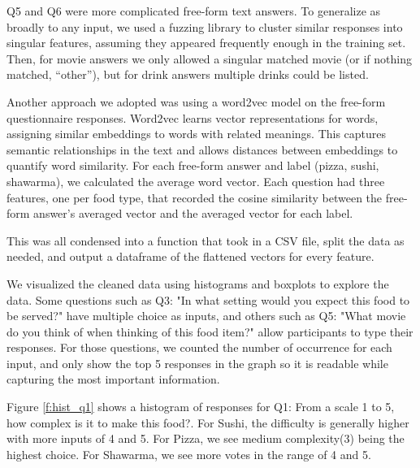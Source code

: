 Q5 and Q6 were more complicated free-form text answers. To generalize as broadly to any input, we used a fuzzing library to cluster similar responses into singular features, assuming they appeared frequently enough in the training set. Then, for movie answers we only allowed a singular matched movie (or if nothing matched, “other”), but for drink answers multiple drinks could be listed.

Another approach we adopted was using a word2vec model on the free-form questionnaire responses. Word2vec learns vector representations for words, assigning similar embeddings to words with related meanings. This captures semantic relationships in the text and allows distances between embeddings to quantify word similarity. For each free-form answer and label (pizza, sushi, shawarma), we calculated the average word vector. Each question had three features, one per food type, that recorded the cosine similarity between the free-form answer's averaged vector and the averaged vector for each label.

This was all condensed into a function that took in a CSV file, split the data as needed, and output a dataframe of the flattened vectors for every feature.

We visualized the cleaned data using histograms and boxplots to explore the data. Some questions such as Q3: "In what setting 
would you expect this food to be served?" have multiple choice as inputs, and others such as Q5: "What movie do you think of when thinking of this food item?"
allow participants to type their responses. For those questions, we counted the number of occurrence for each input, and only show the top 5 responses in the graph 
so it is readable while capturing the most important information.

Figure \ref{f:hist_q1} shows a histogram of responses for Q1: From a scale 1 to 5, how complex is it to make this food?. For Sushi, 
the difficulty is generally higher with more inputs of 4 and 5. For Pizza, we see medium complexity(3) being the highest choice. For Shawarma,
we see more votes in the range of 4 and 5.

